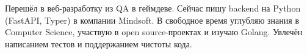 \hspace{0.2in}Перешёл в веб-разработку из QA в геймдеве.
Сейчас пишу backend на Python (FastAPI, Typer) в компании Mindsoft.
В свободное время углубляю знания в Computer Science, участвую в open source-проектах и изучаю Golang.
Увлечён написанием тестов и поддержанием чистоты кода.
